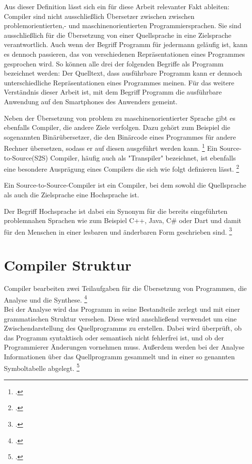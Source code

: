 Aus dieser Definition lässt sich ein für diese Arbeit relevanter Fakt ableiten: Compiler sind nicht ausschließlich Übersetzer zwischen zwischen problemorientierten,- und maschinenorientierten Programmiersprachen.  Sie sind ausschließlich für die Übersetzung von einer Quellsprache in eine Zielsprache verantwortlich.  Auch wenn der Begriff Programm für jedermann geläufig ist,  kann es dennoch passieren,  das von verschiedenen Repräsentationen eines Programmes gesprochen wird.  So können alle drei der folgenden Begriffe als Programm bezeichnet werden: Der Quelltext, dass ausführbare Programm kann er dennoch unterschiedliche Repräsentationen eines Programmes meinen.  Für das weitere Verständnis dieser Arbeit ist,  mit dem Begriff Programm die ausführbare Anwendung auf den Smartphones des Anwenders gemeint.  

Neben der Übersetzung von problem zu maschinenorientierter Sprache gibt es ebenfalls Compiler, die andere Ziele verfolgen. Dazu gehört zum Beispiel die sogenannten Binärübersetzer,  die den Binärcode eines Programmes für andere Rechner übersetzen, sodass er auf diesen ausgeführt werden kann.  \footcite[Vgl.][S. 27]{Ullmann2008} Ein Source-to-Source(S2S) Compiler,  häufig auch als "Transpiler" bezeichnet,  ist ebenfalls eine besondere Ausprägung eines Compilers die sich wie folgt definieren lässt.  \footcite[Vgl.][S. 1629]{IJCSIT2015}
\begin{Def}
Ein Source-to-Source-Compiler ist ein Compiler, bei dem sowohl die Quellsprache als auch die Zielsprache eine Hochsprache ist.
\end{Def}
\vspace{-1em}

Der Begriff Hochsprache ist dabei ein Synonym für die bereits eingeführten problemnahen Sprachen wie zum Beispiel C++,  Java,  C\# oder Dart und damit für den Menschen in einer lesbaren und änderbaren Form geschrieben sind. \footcite[Vgl.][S. 9]{Eisenecker2008} 

\section{Compiler Struktur}
Compiler bearbeiten zwei Teilaufgaben für die Übersetzung von Programmen, die Analyse und die Synthese. \footcite[Vgl.][S. 6]{Ullmann2008}\\
Bei der Analyse wird das Programm in seine Bestandteile zerlegt und mit einer grammatischen Struktur versehen. Diese wird anschließend verwendet um eine Zwischendarstellung des Quellprogramms zu erstellen. Dabei wird überprüft, ob das Programm syntaktisch oder semantisch nicht fehlerfrei ist, und ob der Programmierer Änderungen vornehmen muss.  Außerdem werden bei der Analyse Informationen über das Quellprogramm gesammelt und in einer so genannten Symboltabelle abgelegt.  \footcite[Vgl.][S. 6f]{Ullmann2008}

